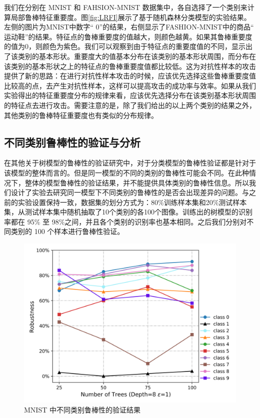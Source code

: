 我们在分别在 MNIST 和 FAHSION-MNIST 数据集中，各自选择了一个类别来计算局部鲁棒特征重要度。图\ref{fig:LRFI}展示了基于随机森林分类模型的实验结果。左侧的图片为MNIST中数字“ 0”的结果，右侧显示了FASHION-MNIST中的商品“ 运动鞋”的结果。特征点的鲁棒重要度的值越大，则颜色越黄。如果其鲁棒重要度的值为0，则颜色为紫色。我们可以观察到由于特征点的重要度值的不同，显示出了该类别的基本形状。重要度大的值基本分布在该类别的基本形状周围，而分布在该类别的基本形状之上的特征点的鲁棒重要度值都比较低。这为对抗性样本的攻击提供了新的思路：在进行对抗性样本攻击的时候，应该优先选择这些鲁棒重要度值比较高的点，去产生对抗性样本，这样可以提高攻击的成功率与效率。如果从我们实验得出的特征重要度分布的规律来看，应该优先选择分布在该类别基本形状周围的特征点去进行攻击。需要注意的是，除了我们给出的以上两个类别的结果之外，其他类别的鲁棒特征重要度也有类似的分布规律。

\subsection{不同类别鲁棒性的验证与分析}

在其他关于树模型的鲁棒性的验证研究中，对于分类模型的鲁棒性验证都是针对于该模型的整体而言的。但是同一模型的不同的类别的鲁棒性可能会不同。在此种情况下，整体的模型鲁棒性的验证结果，并不能提供具体类别的鲁棒性信息。所以我们设计了实验去研究同一模型下不同类别的鲁棒性的是否会出现差异的问题。与之前的实验设置保持一致，数据集的划分方式为：80$\%$训练样本集和20$\%$测试样本集，从测试样本集中随机抽取了10个类别的各100个图像。训练出的树模型的识别率都在 95$\%$ 至 98$\%$之间，并且各个类别的识别率也基本相同。之后我们分别对不同类别的 100 个样本进行鲁棒性验证。

\begin{figure}[!hbt]
\centering
        \includegraphics[scale=0.65]{fig2/C5/mnist_com.png}
	\caption{MNIST 中不同类别鲁棒性的验证结果}
	\label{fig:MNIST不同}	
\end{figure}

